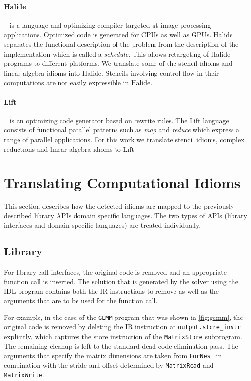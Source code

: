     \paragraph{Halide}~\cite{Ragan-Kelley2013Halide} is a language and
    optimizing compiler targeted at image processing applications.
    Optimized code is generated for CPUs as well as GPUs.
    Halide separates the functional description of the problem from the
    description of the implementation which is called a \emph{schedule}.
    This allows retargeting of Halide programs to different platforms.
    We translate some of the stencil idioms and linear algebra idioms into
    Halide.
    Stencils involving control flow in their computations are not easily
    expressible in Halide.

    \paragraph{Lift}~\cite{steuwer15rewrite, SteuwerRD17, HagedornSSGD18} is an
    optimizing code generator based on rewrite rules.
    The Lift language consists of functional parallel patterns such as
    \emph{map} and \emph{reduce} which  express a range of parallel
    applications.
    For this work we translate stencil idioms, complex reductions and linear
    algebra idioms to Lift.

\section{Translating Computational Idioms}

    This section describes how the detected idioms are mapped to the previously
    described library APIs domain specific languages.
    The two types of APIs (library interfaces and domain specific languages) are
    treated individually.

\subsection{Library}

    For library call interfaces, the original code is removed and an appropriate
    function call is inserted.
    The solution that is generated by the solver using the IDL program contains
    both the IR instructions to remove as well as the arguments that are to be
    used for the function call.

    For example, in the case of the {\tt GEMM} program that was shown in
    \autoref{fig:gemm}, the original code is removed by deleting the IR
    instruction at {\tt output.store\_instr} explicitly, which captures the
    store instruction of the {\tt MatrixStore} subprogram.
    The remaining cleanup is left to the standard dead code elimination pass.
    The arguments that specify the matrix dimensions are taken from
    {\tt ForNest} in combination with the stride and offset determined by
    {\tt MatrixRead} and {\tt MatrixWrite}.

